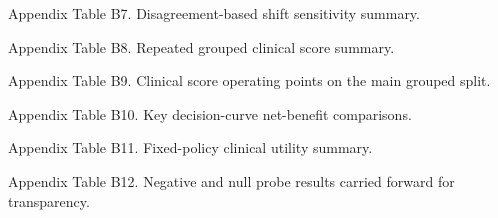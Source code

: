 \documentclass[unnumsec,webpdf,contemporary,large,numbered,nocrop]{oup-authoring-template}
\begin{document}
\begin{appendices}
\begin{table}[!t]
\centering
\scriptsize
\caption{Appendix Table B7. Disagreement-based shift sensitivity summary.}
\label{tab:app-b7}
\begin{adjustbox}{max width=\textwidth}

\end{adjustbox}
\end{table}


\begin{table}[!t]
\centering
\scriptsize
\caption{Appendix Table B8. Repeated grouped clinical score summary.}
\label{tab:app-b8}
\begin{adjustbox}{max width=\textwidth}

\end{adjustbox}
\end{table}


\begin{table}[!t]
\centering
\scriptsize
\caption{Appendix Table B9. Clinical score operating points on the main grouped split.}
\label{tab:app-b9}
\begin{adjustbox}{max width=\textwidth}

\end{adjustbox}
\end{table}


\begin{table}[!t]
\centering
\scriptsize
\caption{Appendix Table B10. Key decision-curve net-benefit comparisons.}
\label{tab:app-b10}
\begin{adjustbox}{max width=\textwidth}

\end{adjustbox}
\end{table}


\begin{table}[!t]
\centering
\scriptsize
\caption{Appendix Table B11. Fixed-policy clinical utility summary.}
\label{tab:app-b11}
\begin{adjustbox}{max width=\textwidth}

\end{adjustbox}
\end{table}


\begin{table}[!t]
\centering
\small
\caption{Appendix Table B12. Negative and null probe results carried forward for transparency.}
\label{tab:app-b12}
\begin{adjustbox}{max width=\textwidth}

\end{adjustbox}
\end{table}



\end{appendices}
\end{document}

